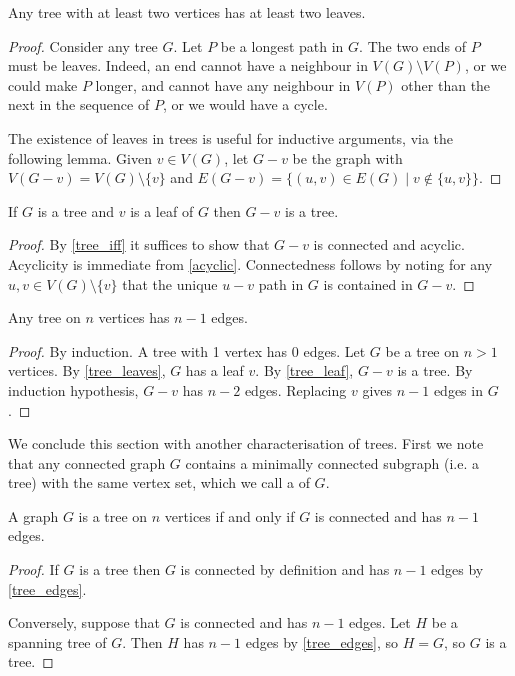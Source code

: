 \begin{lemma}\label{tree_leaves}
Any tree with at least two vertices has at least two leaves.
\end{lemma}
\begin{proof}
Consider any tree $G$. Let $P$ be a longest path in $G$. The two ends of $P$ must be leaves. Indeed, an end cannot have a neighbour in $V(G) \setminus V(P)$, or we could make $P$ longer, and cannot have any neighbour in $V(P)$ other than the next in the sequence of $P$, or we would have a cycle.

The existence of leaves in trees is useful for inductive arguments, via the following lemma. Given $v \in V(G)$, let $G-v$ be the graph with $V(G-v) = V(G)\setminus\{v\}$ and $E(G-v) = \{(u,v) \in E(G) \mid v \notin \{u,v\}\}$.
\end{proof}

\begin{lemma}\label{tree_leaf}
If $G$ is a tree and $v$ is a leaf of $G$ then $G-v$ is a tree.
\end{lemma}
\begin{proof}
By \cref{tree_iff} it suffices to show that $G-v$ is connected and acyclic. Acyclicity is immediate from \cref{acyclic}. Connectedness follows by noting for any $u,v \in V(G)\setminus\{v\}$ that the unique $u-v$ path in $G$ is contained in $G-v$.
\end{proof}

\begin{lemma}\label{tree_edges}
Any tree on $n$ vertices has $n-1$ edges.
\end{lemma}
\begin{proof}
By induction. A tree with 1 vertex has 0 edges. Let $G$ be a tree on $n>1$ vertices. By \cref{tree_leaves}, $G$ has a leaf $v$. By \cref{tree_leaf}, $G-v$ is a tree. By induction hypothesis, $G-v$ has $n-2$ edges. Replacing $v$ gives $n-1$ edges in $G$.
\end{proof}

We conclude this section with another characterisation of trees. First we note that any connected graph $G$ contains a minimally connected subgraph (i.e. a tree) with the same vertex set, which we call a  of $G$.

\begin{lemma}
A graph $G$ is a tree on $n$ vertices if and only if $G$ is connected and has $n-1$ edges.
\end{lemma}

\begin{proof}
If $G$ is a tree then $G$ is connected by definition and has $n-1$ edges by \cref{tree_edges}. 

Conversely, suppose that $G$ is connected and has $n-1$ edges. Let $H$ be a spanning tree of $G$. Then $H$ has $n-1$ edges by \cref{tree_edges}, so $H = G$, so $G$ is a tree.
\end{proof}


